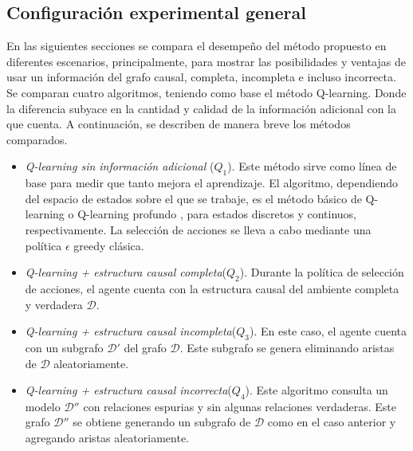 \subsection{Configuración experimental general}

En las siguientes secciones se compara el desempeño 
del método propuesto en diferentes escenarios, principalmente, para mostrar 
las posibilidades y ventajas de usar un información del grafo causal, completa, incompleta e incluso incorrecta. 
Se comparan cuatro algoritmos, teniendo como base
el método Q-learning. Donde la diferencia subyace en la cantidad y calidad de la información adicional con la que cuenta. A continuación, se describen de manera breve los métodos
comparados.

\begin{itemize}
    \item \textit{Q-learning sin información adicional} ($Q_1$). Este método sirve como
    línea de base para medir que tanto mejora el aprendizaje. El algoritmo, dependiendo del espacio de estados sobre el que se trabaje, es el 
    método básico de Q-learning \cite{watkins1992q} o Q-learning profundo \cite{mnih2013playing}, para estados
    discretos y continuos, respectivamente. La selección de acciones se lleva a cabo mediante una política $\epsilon$ greedy clásica.
    \item \textit{Q-learning + estructura causal completa}($Q_2$). Durante la política de selección de acciones, el agente cuenta con la estructura causal del ambiente completa y verdadera $\mathcal{D}$.
    \item \textit{Q-learning + estructura causal incompleta}($Q_3$). En este caso, el agente cuenta con un subgrafo $\mathcal{D'}$ del grafo $\mathcal{D}$. Este subgrafo se genera eliminando aristas de $\mathcal{D}$ aleatoriamente.
    \item \textit{Q-learning + estructura causal incorrecta}($Q_4$). Este algoritmo consulta un modelo $\mathcal{D}''$ con relaciones espurias y sin algunas relaciones verdaderas. Este grafo $\mathcal{D}''$ se obtiene generando un subgrafo de $\mathcal{D}$ como en el caso anterior y agregando aristas aleatoriamente.
\end{itemize}

